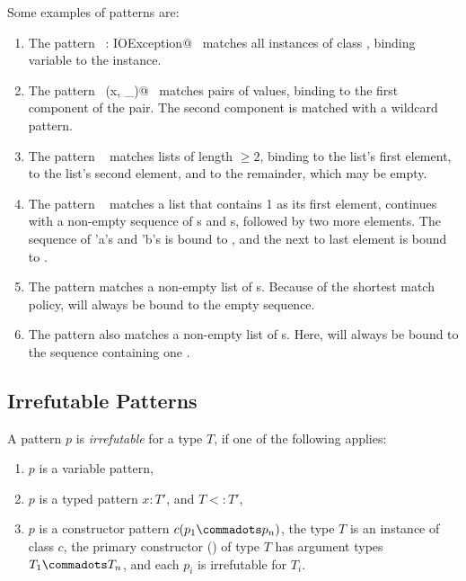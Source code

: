 {\example Some examples of patterns are:
\begin{enumerate}
\item
The pattern ~\lstinline@ex: IOException@~ matches all instances of class
, binding variable  to the instance.
\item
The pattern ~\lstinline@Pair(x, _)@~ matches pairs of values, binding  to
the first component of the pair. The second component is matched
with a wildcard pattern.
\item
The pattern \  matches lists of length $\geq 2$,
binding  to the list's first element,  to the list's
second element, and  to the remainder, which may be empty.
\item
The pattern \  matches a list that
contains 1 as its first element, continues with a non-empty sequence of 
s and s, followed by two more elements. The sequence of 'a's and 'b's
is bound to , and the next to last element is bound to .
\item
The pattern  matches a non-empty list of
s. Because of the shortest match policy,  will always be bound to
the empty sequence.
\item
The pattern  also matches a non-empty list of
s. Here,  will always be bound to
the sequence containing one .
\end{enumerate}

}

\subsection{Irrefutable Patterns}

A pattern $p$ is {\em irrefutable} for a type $T$, if one of the following applies:
\begin{enumerate}
\item $p$ is a variable pattern,
\item $p$ is a typed pattern $x: T'$, and $T <: T'$,
\item $p$ is a constructor pattern $c(p_1 \commadots p_n)$, the type $T$
      is an instance of class $c$, the primary constructor
      () of type $T$ has
      argument types $T_1 \commadots T_n$, and each $p_i$ is irrefutable for $T_i$.
\end{enumerate}

